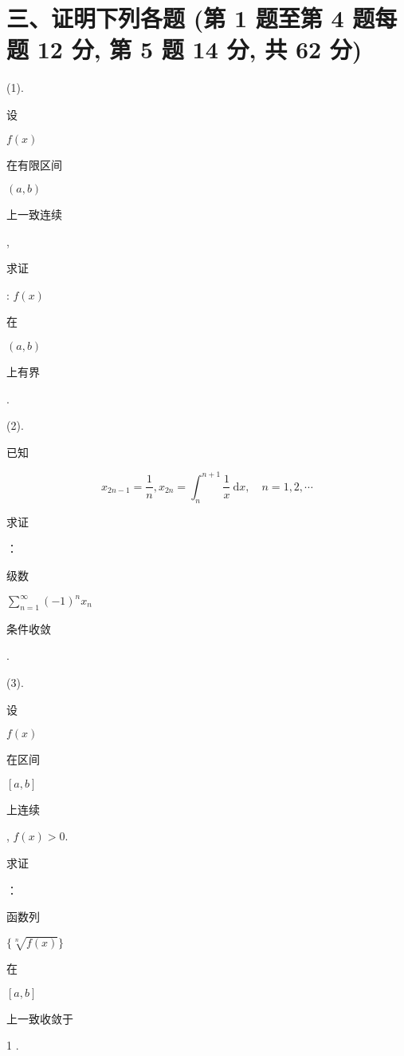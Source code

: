 \documentclass[10pt]{article}
\begin{document}
\section{三、证明下列各题 (第 1 题至第 4 题每题 12 分, 第 5 题 14 分, 共 62 分)}
(1). \begin{CJK}{UTF8}{mj}设\end{CJK} $f(x)$ \begin{CJK}{UTF8}{mj}在有限区间\end{CJK} $(a, b)$ \begin{CJK}{UTF8}{mj}上一致连续\end{CJK}, \begin{CJK}{UTF8}{mj}求证\end{CJK}: $f(x)$ \begin{CJK}{UTF8}{mj}在\end{CJK} $(a, b)$ \begin{CJK}{UTF8}{mj}上有界\end{CJK}.

(2). \begin{CJK}{UTF8}{mj}已知\end{CJK}
$$
x_{2 n-1}=\frac{1}{n}, x_{2 n}=\int_{n}^{n+1} \frac{1}{x} \mathrm{~d} x, \quad n=1,2, \cdots
$$
\begin{CJK}{UTF8}{mj}求证\end{CJK}：\begin{CJK}{UTF8}{mj}级数\end{CJK} $\sum_{n=1}^{\infty}(-1)^{n} x_{n}$ \begin{CJK}{UTF8}{mj}条件收敛\end{CJK}.

(3). \begin{CJK}{UTF8}{mj}设\end{CJK} $f(x)$ \begin{CJK}{UTF8}{mj}在区间\end{CJK} $[a, b]$ \begin{CJK}{UTF8}{mj}上连续\end{CJK}, $f(x)>0$. \begin{CJK}{UTF8}{mj}求证\end{CJK}：\begin{CJK}{UTF8}{mj}函数列\end{CJK} $\{\sqrt[n]{f(x)}\}$ \begin{CJK}{UTF8}{mj}在\end{CJK} $[a, b]$ \begin{CJK}{UTF8}{mj}上一致收敛于\end{CJK} 1 .
\end{document}
